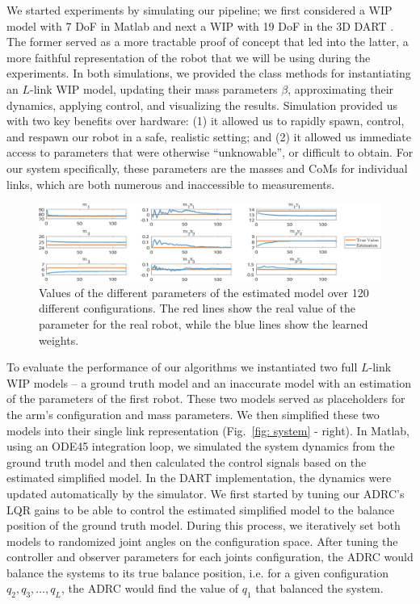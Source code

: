 \documentclass[letterpaper, 10 pt, conference]{ieeeconf}
\begin{document}
We started experiments by simulating our pipeline; we first considered a
\ac{WIP} model with 7 DoF in Matlab and next a \ac{WIP} with 19 DoF in the 3D
\ac{DART} \cite{DART}.  The former served as a more tractable proof of concept
that led into the latter, a more faithful representation of the robot that we
will be using during the experiments.  In both simulations, we provided the
class methods for instantiating an $L$-link \ac{WIP} model, updating their mass
parameters $\beta$, approximating their dynamics, applying control, and
visualizing the results. Simulation provided us with two key benefits over
hardware: (1) it allowed us to rapidly spawn, control, and respawn our robot in
a safe, realistic setting; and (2) it allowed us immediate access to parameters
that were otherwise ``unknowable'', or difficult to obtain.  For our system
specifically, these parameters are the masses and \aclp{CoM} for individual
links, which are both numerous and inaccessible to measurements.
\begin{figure}[!ht]
\centering
\includegraphics[width=0.9\linewidth]{figs/Value3_fixed2.eps}
\vspace{-.5\baselineskip}
\caption{\label{fig:Values} Values of the different parameters of the estimated
model over 120 different configurations. The red lines show the real value of
the parameter for the real robot, while the blue lines show the learned
weights.}
\end{figure}
To evaluate the performance of our algorithms we instantiated two full $L$-link
\ac{WIP} models -- a ground truth model and an inaccurate model with an
estimation of the parameters of the first robot. These two models served as
placeholders for the arm's configuration and mass parameters. We then simplified
these two models into their single link representation (Fig.~\ref{fig: system} -
right). In Matlab, using an ODE45 integration loop, we simulated the system
dynamics from the ground truth model and then calculated the control signals
based on the estimated simplified model. In the \ac{DART} implementation, the
dynamics were updated automatically by the simulator. We first started by tuning
our \ac{ADRC}'s LQR gains to be able to control the estimated simplified model
to the balance position of the ground truth model. During this process, we
iteratively set both models to randomized joint angles on the configuration
space. After tuning the controller and observer parameters for each joints
configuration, the \ac{ADRC} would balance the systems to its true balance
position, i.e. for a given configuration $q_2, q_3, \dots, q_L$, the \ac{ADRC}
would find the value of $q_1$ that balanced the system.
\end{document}
